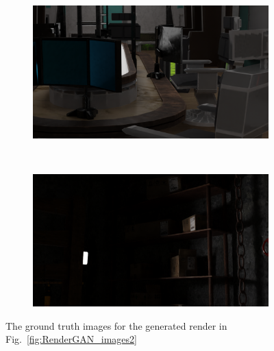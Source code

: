 \begin{figure}[h!]
    \centering
    \begin{subfigure}[b]{0.9\textwidth}
     \includegraphics[width=\textwidth]{figures/result/gt/s6_camera_60_cycles.png}
     \caption{}
    \end{subfigure}
    \\ \vspace{0.2cm}
    \begin{subfigure}[b]{0.9\textwidth}
     \includegraphics[width=\textwidth]{figures/result/gt/s3_camera_17_cycles.png}
     \caption{}
    \end{subfigure}
    \caption[Cycles Render]{The ground truth images for the generated render in Fig.~\ref{fig:RenderGAN_images2}}
    \label{fig:gt_images2}
\end{figure}
